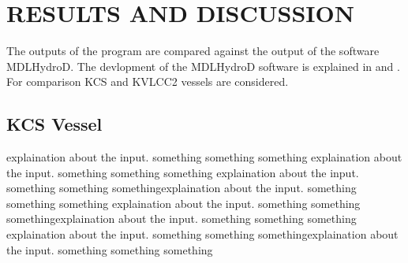 \chapter{RESULTS AND DISCUSSION}
The outputs of the program are compared against the output of the software MDLHydroD. The devlopment of the 
MDLHydroD software is explained in \cite{guha2013development} and \cite{guha2015estimation}.
For comparison KCS and KVLCC2 vessels are considered. 

\section{KCS Vessel}
explaination about the input. something something something explaination about the input. something something something
explaination about the input. something something somethingexplaination about the input. something something something
explaination about the input. something something somethingexplaination about the input. something something something
explaination about the input. something something somethingexplaination about the input. something something something


